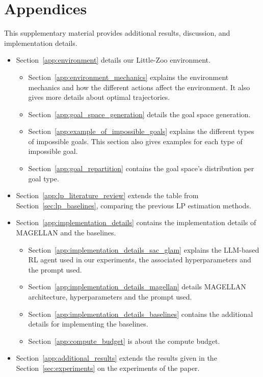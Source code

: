 \section*{Appendices}
This supplementary material provides additional results, discussion, and implementation details.

\begin{itemize}
    \item Section~\ref{app:environment} details our Little-Zoo environment. 
    \begin{itemize}
        \item Section~\ref{app:environment_mechanics} explains the environment mechanics and how the different actions affect the environment. It also gives more details about optimal trajectories.
        \item Section~\ref{app:goal_space_generation} details the goal space generation.
        \item Section~\ref{app:example_of_impossible_goals} explains the different types of impossible goals. This section also gives examples for each type of impossible goal.
        \item Section~\ref{app:goal_repartition} contains the goal space's distribution per goal type.
    \end{itemize}
    \item Section~\ref{app:lp_literature_review} extends the table from Section~\ref{sec:lp_baselines}, comparing the previous LP estimation methods. 
    \item Section~\ref{app:implementation_details} contains the implementation details of MAGELLAN and the baselines.
    \begin{itemize}
        \item Section~\ref{app:implementation_details_sac_glam} explains the LLM-based RL agent used in our experiments, the associated hyperparameters and the prompt used.
        \item Section~\ref{app:implementation_details_magellan} details MAGELLAN architecture, hyperparameters and the prompt used.
        \item Section~\ref{app:implementation_details_baselines} contains the additional details for implementing the baselines.
        \item Section~\ref{app:compute_budget} is about the compute budget.
    \end{itemize}
    \item Section~\ref{app:additional_results} extends the results given in the Section~\ref{sec:experiments} on the experiments of the paper.

\end{itemize}
